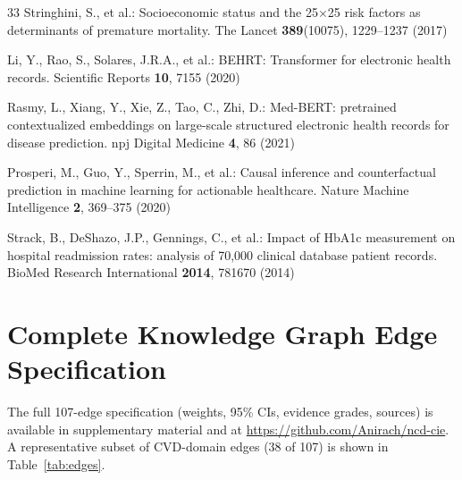 \documentclass[runningheads]{llncs}
\begin{document}
\begin{thebibliography}{33}
Stringhini, S., et al.:
Socioeconomic status and the 25$\times$25 risk factors as
determinants of premature mortality.
The Lancet \textbf{389}(10075), 1229--1237 (2017)

Li, Y., Rao, S., Solares, J.R.A., et al.:
BEHRT: Transformer for electronic health records.
Scientific Reports \textbf{10}, 7155 (2020)

Rasmy, L., Xiang, Y., Xie, Z., Tao, C., Zhi, D.:
Med-BERT: pretrained contextualized embeddings on large-scale
structured electronic health records for disease prediction.
npj Digital Medicine \textbf{4}, 86 (2021)

Prosperi, M., Guo, Y., Sperrin, M., et al.:
Causal inference and counterfactual prediction in machine learning
for actionable healthcare.
Nature Machine Intelligence \textbf{2}, 369--375 (2020)

Strack, B., DeShazo, J.P., Gennings, C., et al.:
Impact of HbA1c measurement on hospital readmission rates:
analysis of 70,000 clinical database patient records.
BioMed Research International \textbf{2014}, 781670 (2014)

\end{thebibliography}

\appendix
\section{Complete Knowledge Graph Edge Specification}\label{app:edges}

The full 107-edge specification (weights, 95\% CIs, evidence grades,
sources) is available in supplementary material and at
\url{https://github.com/Anirach/ncd-cie}.
A representative subset of CVD-domain edges (38 of 107) is shown in
Table~\ref{tab:edges}.
\end{document}
